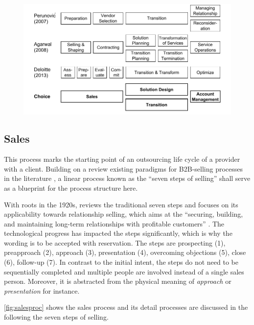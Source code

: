 	\begin{figure}[caption={Outsourcing process framework comparison}, label={fig:outsourcingprocesses}]
		{	\includegraphics[width=.95\textwidth]{figures/outsourcingprocs.pdf}}
	\end{figure} 
	
	
	\subsection{Sales}
	
	This process marks the starting point of an outsourcing life cycle of a provider with a client. Building on a review existing paradigms for B2B-selling processes in the literature \citep{_ge_2011}, a linear process known as the  \enquote{seven steps of selling} shall serve as a blueprint for the process structure here. 
	
	With roots in the 1920s, \cite{Moncrief_2005} reviews the traditional seven steps and focuses on its applicability towards relationship selling, which aims at the \enquote{securing, building, and maintaining long-term relationships with profitable customers} \citep[]{Moncrief_2005}. The technological progress has impacted the steps significantly, which is why the wording is to be accepted with reservation. The steps are prospecting (1), preapproach (2), approach (3), presentation (4), overcoming objections (5), close (6), follow-up (7). In contrast to the initial intent, the steps do not need to be sequentially completed and multiple people are involved instead of a single sales person. Moreover, it is abstracted from the physical meaning of \textit{approach} or \textit{presentation} for instance.
	
	\Fig \ref{fig:salesproc} shows the sales process and its detail processes are discussed in the following \wrt the seven steps of selling. 
	
